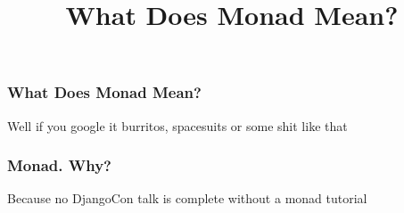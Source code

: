 {


  \begin{frame}[plain] 
  \title{What Does Monad Mean?}
  
  \vspace{3em}

  \begin{TitleBoxWhatDoesMonadMean}
    \begin{center}
    {\Large \inserttitle}
    \end{center}
  \end{TitleBoxWhatDoesMonadMean}

  \end{frame}
}


\begin{frame}
\frametitle{What Does Monad Mean?}
\begin{block}{Well if you google it}
burritos, spacesuits or some shit like that
\end{block}
\end{frame}


\begin{frame}
\frametitle{Monad. Why?}
\begin{block}{Because}
no DjangoCon talk is complete without a monad tutorial
\end{block}
\end{frame}



